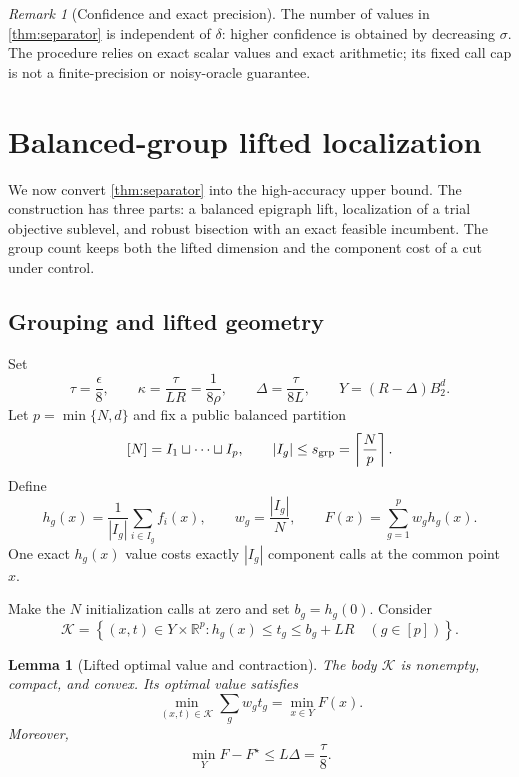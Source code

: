 \documentclass[11pt]{article}
\numberwithin{equation}{section}
\newtheorem{lemma}[lemma]{Lemma}
\theoremstyle{remark}
\newtheorem{remark}[remark]{Remark}
\theoremstyle{definition}
\newcommand{\R}{\mathbb{R}}
\newcommand{\cK}{\mathcal{K}}
\newcommand{\Ball}{B_2}
\newcommand{\eps}{\epsilon}
\begin{document}
\begin{remark}[Confidence and exact precision]
The number of values in \cref{thm:separator} is independent of
$\delta$: higher confidence is obtained by decreasing $\sigma$.
The procedure relies on exact scalar values and exact arithmetic;
its fixed call cap is not a finite-precision or noisy-oracle guarantee.
\end{remark}

\section{Balanced-group lifted localization}
\label{sec:localization-upper}

We now convert \cref{thm:separator} into the high-accuracy upper
bound. The construction has three parts: a balanced epigraph lift,
localization of a trial objective sublevel, and robust bisection with
an exact feasible incumbent. The group count keeps both the lifted
dimension and the component cost of a cut under control.

\subsection{Grouping and lifted geometry}

Set
\[
\tau=\frac\eps8,
\qquad
\kappa=\frac{\tau}{LR}=\frac1{8\rho},
\qquad
\Delta=\frac{\tau}{8L},
\qquad
Y=(R-\Delta)\Ball^d.
\]
Let $p=\min\{N,d\}$ and fix a public balanced partition
\[
[N]=I_1\sqcup\cdots\sqcup I_p,
\qquad
|I_g|\le s_{\rm grp}=\left\lceil\frac Np\right\rceil.
\]
Define
\[
h_g(x)=\frac1{|I_g|}\sum_{i\in I_g}f_i(x),
\qquad
w_g=\frac{|I_g|}{N},
\qquad
F(x)=\sum_{g=1}^p w_gh_g(x).
\]
One exact $h_g(x)$ value costs exactly $|I_g|$ component calls at the common point $x$.

Make the $N$ initialization calls at zero and set $b_g=h_g(0)$.  Consider
\begin{equation}
\cK=
\left\{(x,t)\in Y\times\R^p:
 h_g(x)\le t_g\le b_g+LR\quad(g\in[p])
\right\}.
\label{eq:lifted-body}
\end{equation}

\begin{lemma}[Lifted optimal value and contraction]
\label{lem:group-lift}
The body $\cK$ is nonempty, compact, and convex. Its optimal value satisfies
\[
\min_{(x,t)\in\cK}\sum_gw_gt_g
=
\min_{x\in Y}F(x).
\]
Moreover,
\[
\min_YF-F^\star\le L\Delta=\frac\tau8.
\]
\end{lemma}
\end{document}
